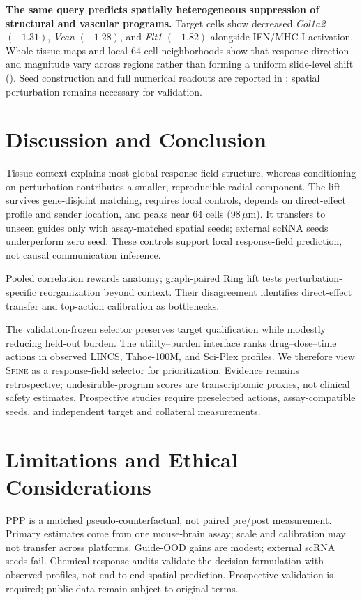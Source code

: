 \documentclass[sigconf,review,balance=false]{acmart}
\newcommand{\methodname}{\textsc{Spine}\xspace}
\newcommand{\ppp}{\textsc{PPP}\xspace}
\begin{document}
\textbf{The same query predicts spatially heterogeneous suppression of
structural and vascular programs.} Target cells show decreased
\textit{Col1a2} $(-1.31)$, \textit{Vcan} $(-1.28)$, and \textit{Flt1}
$(-1.82)$ alongside IFN/MHC-I activation. Whole-tissue maps and local
64-cell neighborhoods show that response direction and magnitude vary across
regions rather than forming a uniform slide-level shift
(). Seed construction and full numerical
readouts are reported in
;
spatial perturbation remains necessary for validation.
\FloatBarrier
\section{Discussion and Conclusion}
\label{sec:discussion_conclusion}
Tissue context explains most global response-field structure, whereas
conditioning on perturbation contributes a smaller, reproducible radial
component. The lift survives gene-disjoint matching, requires local controls,
depends on direct-effect profile and sender location, and peaks near 64 cells
(98\,$\mu$m). It transfers to unseen guides only with assay-matched spatial
seeds; external scRNA seeds underperform zero seed. These controls support
local response-field prediction, not causal communication inference.

Pooled correlation rewards anatomy; graph-paired Ring lift tests
perturbation-specific reorganization beyond context. Their disagreement
identifies direct-effect transfer and top-action calibration as bottlenecks.

The validation-frozen selector preserves target qualification while modestly
reducing held-out burden. The utility--burden interface ranks drug--dose--time
actions in observed LINCS, Tahoe-100M, and Sci-Plex profiles. We therefore view
\methodname{} as a response-field selector for prioritization. Evidence
remains retrospective; undesirable-program scores are
transcriptomic proxies, not clinical safety estimates. Prospective studies
require preselected actions, assay-compatible seeds, and independent target
and collateral measurements.

\section{Limitations and Ethical Considerations}
\label{sec:limitations_ethical_considerations}
\ppp is a matched pseudo-counterfactual, not paired pre/post measurement.
Primary estimates come from one mouse-brain assay; scale and calibration may
not transfer across platforms. Guide-OOD gains are
modest; external scRNA seeds fail. Chemical-response audits validate the
decision formulation with observed
profiles, not end-to-end spatial prediction. Prospective validation is
required; public data remain subject to original terms.
\end{document}
